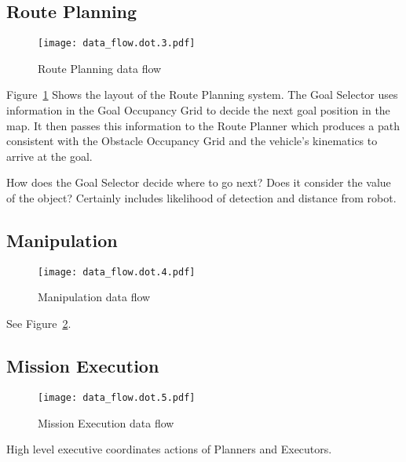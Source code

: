 \documentclass[12pt]{article}
\begin{document}
\subsection{Route Planning}
\begin{figure}
\centering
\texttt{[image: data\_flow.dot.3.pdf]}
\caption{Route Planning data flow}
\label{fig_df_rp}
\end{figure}
Figure~\ref{fig_df_rp} Shows the layout of the Route Planning system. The Goal Selector uses information in the Goal Occupancy Grid to decide the next goal position in the map. It then passes this information to the Route Planner which produces a path consistent with the Obstacle Occupancy Grid and the vehicle's kinematics to arrive at the goal.

How does the Goal Selector decide where to go next? Does it consider the value of the object? Certainly includes likelihood of detection and distance from robot.

\subsection{Manipulation}\label{Manipulation}
\begin{figure}
\centering
\texttt{[image: data\_flow.dot.4.pdf]}
\caption{Manipulation data flow}
\label{fig_df_man}
\end{figure}
See Figure~\ref{fig_df_man}.

\subsection{Mission Execution}\label{MissionExecution}
\begin{figure}
\centering
\texttt{[image: data\_flow.dot.5.pdf]}
\caption{Mission Execution data flow}
\label{fig_df_exec}
\end{figure}

High level executive coordinates actions of Planners and Executors.



\end{document}

